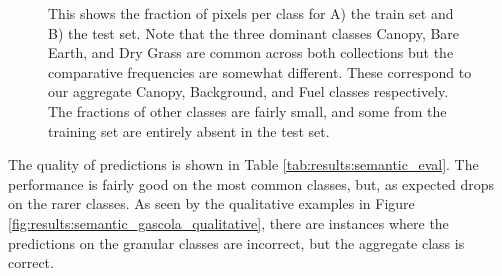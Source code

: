 \begin{figure}[h!]
   \centering
   \caption{This shows the fraction of pixels per class for A) the train set and B) the test set. Note that the three dominant classes Canopy, Bare Earth, and Dry Grass are common across both collections but the comparative frequencies are somewhat different. These correspond to our aggregate Canopy, Background, and Fuel classes respectively. The fractions of other classes are fairly small, and some from the training set are entirely absent in the test set.}
   \label{fig:results:semantic_class_fracs}                %
\end{figure}

The quality of predictions is shown in Table \ref{tab:results:semantic_eval}. The performance is fairly good on the most common classes, but, as expected drops on the rarer classes. As seen by the qualitative examples in Figure \ref{fig:results:semantic_gascola_qualitative}, there are instances where the predictions on the granular classes are incorrect, but the aggregate class is correct.

